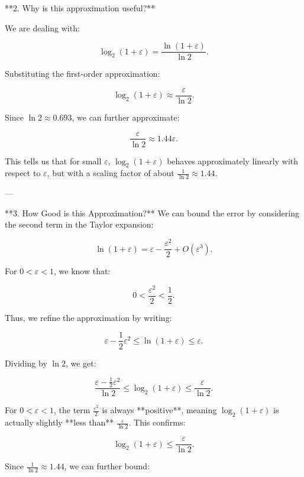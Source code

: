 {         **2. Why is this approximation useful?**  
       
       We are dealing with:
       
       \[
       \log_2(1+\varepsilon) = \frac{\ln(1+\varepsilon)}{\ln 2}.
       \]
       
       Substituting the first-order approximation:
       
       \[
       \log_2(1+\varepsilon) \approx \frac{\varepsilon}{\ln 2}.
       \]
       
       Since \( \ln 2 \approx 0.693 \), we can further approximate:
       
       \[
       \frac{\varepsilon}{\ln 2} \approx 1.44 \varepsilon.
       \]
       
       This tells us that for small \( \varepsilon \), \( \log_2(1+\varepsilon) \) behaves approximately linearly with respect to \( \varepsilon \), but with a scaling factor of about \( \frac{1}{\ln 2} \approx 1.44 \).
       
       ---
       
         **3. How Good is this Approximation?**
       We can bound the error by considering the second term in the Taylor expansion:
       
       \[
       \ln(1+\varepsilon) = \varepsilon - \frac{\varepsilon^2}{2} + O(\varepsilon^3).
       \]
       
       For \( 0 < \varepsilon < 1 \), we know that:
       
       \[
       0 < \frac{\varepsilon^2}{2} < \frac{1}{2}.
       \]
       
       Thus, we refine the approximation by writing:
       
       \[
       \varepsilon - \frac{1}{2} \varepsilon^2 \leq \ln(1+\varepsilon) \leq \varepsilon.
       \]
       
       Dividing by \( \ln 2 \), we get:
       
       \[
       \frac{\varepsilon - \frac{1}{2} \varepsilon^2}{\ln 2} \leq \log_2(1+\varepsilon) \leq \frac{\varepsilon}{\ln 2}.
       \]
       
       For \( 0 < \varepsilon < 1 \), the term \( \frac{\varepsilon^2}{2} \) is always **positive**, meaning \( \log_2(1+\varepsilon) \) is actually slightly **less than** \( \frac{\varepsilon}{\ln 2} \). This confirms:
       
       \[
       \log_2(1+\varepsilon) \leq \frac{\varepsilon}{\ln 2}.
       \]
       
       Since \( \frac{1}{\ln 2} \approx 1.44 \), we can further bound:
       
}
